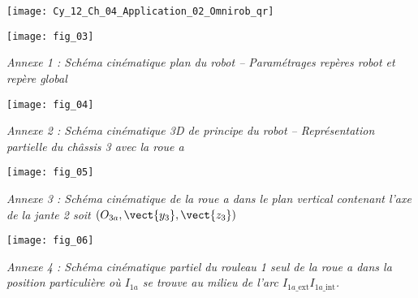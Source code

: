 \ifprof%
\begin{corrige}
\end{corrige}\else\fi

\ifprof
\else
\begin{marginfigure}
\centering
\texttt{[image: Cy\_12\_Ch\_04\_Application\_02\_Omnirob\_qr]}
\end{marginfigure}
\fi


\begin{center}
\texttt{[image: fig\_03]}

\textit{Annexe 1 : Schéma cinématique plan du robot -- Paramétrages repères robot et repère global}
\end{center}
\begin{center}
\texttt{[image: fig\_04]}

\textit{Annexe 2 : Schéma cinématique 3D de principe du robot -- Représentation partielle du châssis 3 avec la roue a}
\end{center}
\begin{center}
\texttt{[image: fig\_05]}

\textit{Annexe 3 : Schéma cinématique de la roue a dans le plan vertical contenant l'axe de la jante 2 soit $\left( O_{3a},\vect{y_3},\vect{z_3}\right)$}
\end{center}
\begin{center}
\texttt{[image: fig\_06]}

\textit{Annexe 4 : Schéma cinématique partiel du rouleau 1 seul de la roue a dans la position particulière où $I_{1a}$ se trouve au milieu de l'arc $I_{1a\_\text{ext}}I_{1a\_\text{int}}$.}

\end{center}
